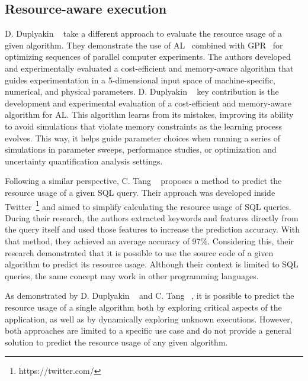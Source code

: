 \subsection{Resource-aware execution}
\label{subsec:resource-aware-execution}

D. Duplyakin \etal~\cite{duplyakin2018} take a different approach to evaluate the resource usage of a given algorithm.
They demonstrate the use of \ac{AL}~\cite{active-learning} combined with \ac{GPR}~\cite{gaussian-process-regression} for optimizing sequences of parallel computer experiments.
The authors developed and experimentally evaluated a cost-efficient and memory-aware algorithm that guides experimentation in a 5-dimensional input space of machine-specific, numerical, and physical parameters.
D. Duplyakin \etal~\cite{duplyakin2018} key contribution is the development and experimental evaluation of a cost-efficient and memory-aware algorithm for \ac{AL}.
This algorithm learns from its mistakes, improving its ability to avoid simulations that violate memory constraints as the learning process evolves.
This way, it helps guide parameter choices when running a series of simulations in parameter sweeps, performance studies, or optimization and uncertainty quantification analysis settings.

Following a similar perspective, C. Tang \etal~\cite{tang2021} proposes a method to predict the resource usage of a given \ac{SQL} query.
Their approach was developed inside Twitter~\footnote{https://twitter.com/} and aimed to simplify calculating the resource usage of \ac{SQL} queries.
During their research, the authors extracted keywords and features directly from the query itself and used those features to increase the prediction accuracy.
With that method, they achieved an average accuracy of 97\%.
Considering this, their research demonstrated that it is possible to use the source code of a given algorithm to predict its resource usage.
Although their context is limited to SQL queries, the same concept may work in other programming languages.

As demonstrated by D. Duplyakin \etal~\cite{duplyakin2018} and C. Tang \etal~\cite{tang2021}, it is possible to predict the resource usage of a single algorithm both by exploring critical aspects of the application, as well as by dynamically exploring unknown executions.
However, both approaches are limited to a specific use case and do not provide a general solution to predict the resource usage of any given algorithm.
